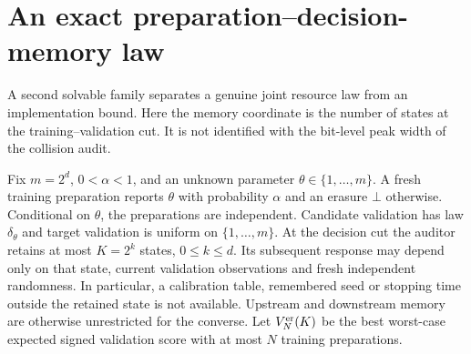 \section{An exact preparation--decision-memory law}
\label{sec:joint-law}
A second solvable family separates a genuine joint resource law from an
implementation bound. Here the memory coordinate is the number of states
at the training--validation cut. It is not identified with the bit-level
peak width of the collision audit.

Fix $m=2^d$, $0<\alpha<1$, and an unknown parameter
$\theta\in\{1,\ldots,m\}$. A fresh training preparation reports
$\theta$ with probability $\alpha$ and an erasure $\bot$ otherwise.
Conditional on $\theta$, the preparations are independent. Candidate
validation has law $\delta_\theta$ and target validation is uniform on
$\{1,\ldots,m\}$. At the decision cut the auditor retains at most
$K=2^k$ states, $0\le k\le d$. Its subsequent response may depend only
on that state, current validation observations and fresh independent
randomness. In particular, a calibration table, remembered seed or
stopping time outside the retained state is not available. Upstream and
downstream memory are otherwise unrestricted for the converse. Let
$V_N^{\rm er}(K)$ be the best worst-case expected signed validation score
with at most $N$ training preparations.

